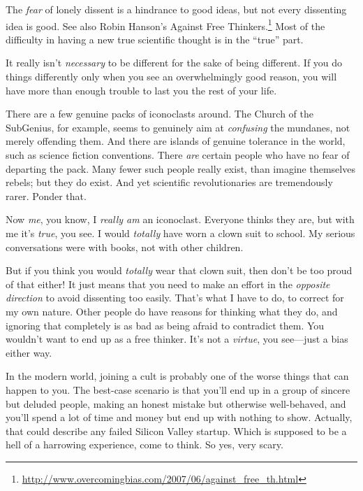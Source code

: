 {
 The \textit{fear} of lonely dissent is a hindrance to good ideas,
but not every dissenting idea is good. See also Robin
Hanson's Against Free Thinkers.\footnote{\url{http://www.overcomingbias.com/2007/06/against_free_th.html}} Most of the difficulty
in having a new true scientific thought is in the
``true'' part.}

{
 It really isn't \textit{necessary} to be different
for the sake of being different. If you do things differently only when
you see an overwhelmingly good reason, you will have more than enough
trouble to last you the rest of your life.}

{
 There are a few genuine packs of iconoclasts around. The Church of
the SubGenius, for example, seems to genuinely aim at
\textit{confusing} the mundanes, not merely offending them. And there
are islands of genuine tolerance in the world, such as science fiction
conventions. There \textit{are} certain people who have no fear of
departing the pack. Many fewer such people really exist, than imagine
themselves rebels; but they do exist. And yet scientific
revolutionaries are tremendously rarer. Ponder that.}

{
 Now \textit{me}, you know, I \textit{really am} an iconoclast.
Everyone thinks they are, but with me it's
\textit{true}, you see. I would \textit{totally} have worn a clown suit
to school. My serious conversations were with books, not with other
children.}

{
 But if you think you would \textit{totally} wear that clown suit,
then don't be too proud of that either! It just means
that you need to make an effort in the \textit{opposite direction} to
avoid dissenting too easily. That's what I have to do,
to correct for my own nature. Other people do have reasons for thinking
what they do, and ignoring that completely is as bad as being afraid to
contradict them. You wouldn't want to end up as a free
thinker. It's not a \textit{virtue}, you see---just a
bias either way.}

\myendsectiontext

\label{cultish_countercultishness}

{
 In the modern world, joining a cult is probably one of the worse
things that can happen to you. The best-case scenario is that
you'll end up in a group of sincere but deluded people,
making an honest mistake but otherwise well-behaved, and
you'll spend a lot of time and money but end up with
nothing to show. Actually, that could describe any failed Silicon
Valley startup. Which is supposed to be a hell of a harrowing
experience, come to think. So yes, very scary. }

